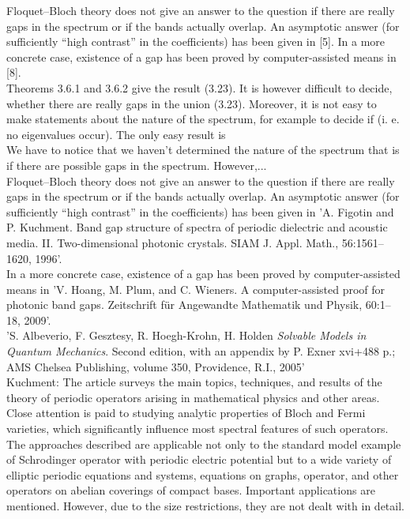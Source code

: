 Floquet–Bloch theory does not give an answer to the question if there are really gaps in the spectrum or if the bands actually overlap. An asymptotic answer (for sufficiently “high contrast” in the coefficients) has been given in [5]. In a more concrete case, existence of a gap has been proved by computer-assisted means in [8].	
~\\

Theorems 3.6.1 and 3.6.2 give the result (3.23). It is however difficult to decide, whether there are really gaps in the union (3.23). Moreover, it is not easy to make statements about the nature of the spectrum, for example to decide if (i. e. no eigenvalues occur). The only easy result is	
~\\
	
We have to notice that we haven't determined the nature of the spectrum that is if there are possible gaps in the spectrum. However,... 
~\\

Floquet–Bloch theory does not give an answer to the question if there are really gaps in the spectrum or if the bands actually overlap. An asymptotic answer (for sufficiently “high contrast” in the coefficients) has been given in 'A. Figotin and P. Kuchment. Band gap structure of spectra of periodic dielectric and acoustic media. II. Two-dimensional photonic crystals. SIAM J. Appl. Math., 56:1561–1620, 1996'. 
~\\

In a more concrete case, existence of a gap has been proved by computer-assisted means in 'V. Hoang, M. Plum, and C. Wieners. A computer-assisted proof for photonic band gaps. 
Zeitschrift für Angewandte Mathematik und Physik, 60:1–18, 2009'.
~\\

'S. Albeverio, F. Gesztesy, R. Hoegh-Krohn, H. Holden {\it Solvable Models in Quantum Mechanics}. Second edition, with an appendix by P. Exner xvi+488 p.; AMS Chelsea Publishing, volume 350, Providence, R.I., 2005'
~\\
 
Kuchment: The article surveys the main topics, techniques, and results of the theory of periodic operators arising in mathematical physics and other areas. Close attention is paid to studying analytic properties of Bloch and Fermi varieties, which significantly influence most spectral features of such operators. The approaches described are applicable not only to the standard model example of Schrodinger operator with periodic electric potential but to a wide variety of elliptic periodic equations and systems, equations on graphs, operator, and other operators on abelian coverings of compact bases. Important applications are mentioned. However, due to the size restrictions, they are not dealt with in detail.
~\\

